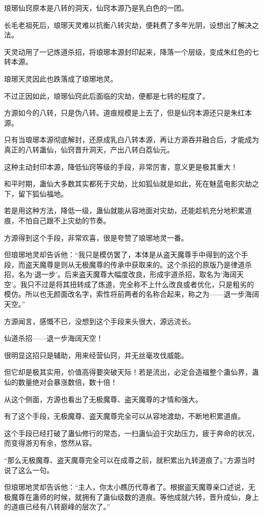 \begin{this_body}
琅琊仙窍原本是八转的洞天，仙窍本源乃是乳白色的一团。

长毛老祖死后，琅琊天灵难以抗衡八转灾劫，便耗费了多年光阴，设想出了解决之法。

天灵动用了一记炼道杀招，将琅琊本源封印起来，降落一个层级，变成朱红色的七转本源。

琅琊天灵因此也跌落成了琅琊地灵。

不过正因如此，琅琊仙窍此后面临的灾劫，便都是七转的程度了。

方源如今的八转，只是伪八转。道痕规模是上去了，但是仙窍本源还只是朱红本源。

只有当琅琊本源彻底解封，还原成乳白八转本源，再让方源吞并融合后，才能成为真正的八转蛊仙，仙窍晋升洞天，产出八转白荔仙元。

这种主动封印本源，降低仙窍等级的手段，非常厉害，意义更是极其重大！

和平时期，蛊仙大多数其实都死于灾劫，比如狐仙就是如此，死在魅蓝电影灾劫之下，留下狐仙福地。

若是用这种方法，降低一级，蛊仙就能从容地面对灾劫，还能趁机充分地积累道痕，不怕自己跟不上灾劫的节奏。

方源得到这个手段，非常欢喜，很是夸赞了琅琊地灵一番。

但琅琊地灵却告诉他：“我只是模仿罢了，本体是从盗天魔尊手中得到的这个手段，而盗天魔尊是则从无极魔尊的传承中获取来的。这个杀招的原版乃是律道杀招，名为‘退一步’。后来盗天魔尊大幅度改良，形成宇道杀招，取名为‘海阔天空’。我只不过是将其扭转成了炼道，完全称不上什么改良或者优化，只是粗劣的模仿。所以也无颜面改名字，索性将前两者的名称合起来，称之为——退一步海阔天空。”

方源闻言，感慨不已，没想到这个手段来头很大，源远流长。

仙道杀招——退一步海阔天空！

很明显这招只是辅助，用来经营仙窍，并无丝毫攻伐威能。

但它却是极其实用，价值高得要突破天际！若是流出，必定会造福整个蛊仙界，蛊仙的数量绝对会暴涨数倍，数十倍！

从这个侧面，方源也看出了无极魔尊、盗天魔尊的才情和强大。

有了这个手段，无极魔尊、盗天魔尊完全可以从容地渡劫，不断地积累道痕。

这个手段已经打破了蛊仙修行的常态，一扫蛊仙迫于灾劫压力，疲于奔命的状况，而变得游刃有余，悠然从容。

“那么无极魔尊、盗天魔尊完全可以在成尊之前，就积累出九转道痕了。”方源当时说了这么一句。

但琅琊地灵却告诉他：“主人，你太小瞧历代尊者了。根据盗天魔尊亲口述说，无极魔尊在蛊师的时候，就拥有了蛊仙级数的道痕。等他成就六转，晋升成仙，身上的道痕已经有八转巅峰的层次了。”

\end{this_body}

